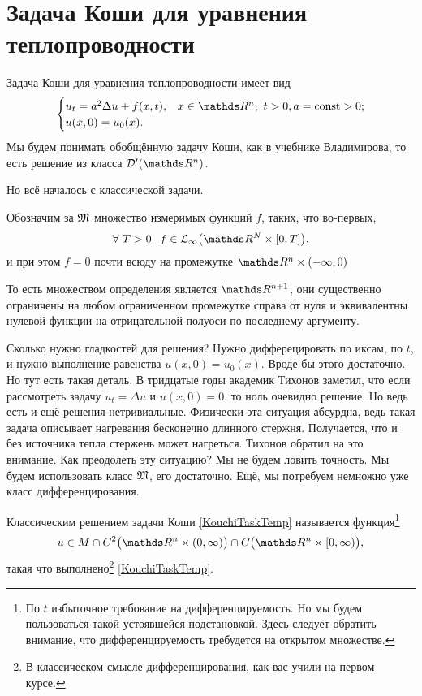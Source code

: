 \section{Задача Коши для уравнения теплопроводности}
Задача Коши для уравнения теплопроводности имеет вид
\begin{equation}\label{KouchiTaskTemp}
  \begin{cases}
     u_t = a^2\Delta u + f(x,t),& x\in\R^n,\ t>0,a=\const>0;\\
     u(x,0) = u_0(x).
  \end{cases}
\end{equation}
Мы будем понимать обобщённую задачу Коши, как в учебнике Владимирова, то есть решение из класса $\D'(\R^n)$.

Но всё началось с классической задачи.
\begin{Def}
  Обозначим за $\mathfrak M$ множество измеримых функций $f$, таких, что во-первых, 
\[\forall\ T>0\pau f\in \L_{\infty}\big(\R^N\times[0,T]\big),\]
и при этом $f=0$ почти всюду на промежутке $\R^n\times(-\infty,0)$
\end{Def}
То есть множеством определения является $\R^{n+1}$, они существенно ограничены на любом ограниченном промежутке справа от нуля и эквивалентны нулевой функции на отрицательной полуоси по последнему аргументу.

Сколько нужно гладкостей для решения? Нужно дифферецировать по иксам, по $t$, и нужно выполнение равенства $u(x,0)=u_0(x)$. Вроде бы этого достаточно. Но тут есть такая деталь. В тридцатые годы академик Тихонов заметил, что если рассмотреть задачу $u_t = \Delta u$ и $u(x,0)=0$, то ноль очевидно решение. Но ведь есть и ещё решения нетривиальные. Физически эта ситуация абсурдна, ведь такая задача описывает нагревания бесконечно длинного стержня. Получается, что и без источника тепла стержень может нагреться. Тихонов обратил на это внимание. Как преодолеть эту ситуацию? Мы не будем ловить точность. Мы будем использовать класс $\mathfrak M$, его достаточно. Ещё, мы потребуем немножно уже класс дифференцирования.
\begin{Def}
  Классическим решением задачи Коши \ref{KouchiTaskTemp} называется функция\footnote{По $t$ избыточное требование на дифференцируемость. Но мы будем пользоваться такой устоявшейся подстановкой. Здесь следует обратить внимание, что дифференцируемость требудется на открытом множестве.}
\[
  u\in M\cap C^2\big(\R^n\times(0,\infty)\big)\cap C\big(\R^n\times[0,\infty)\big),
\]
такая что выполнено\footnote{В классическом смысле дифференцирования, как вас учили на первом курсе.} \eqref{KouchiTaskTemp}.
\end{Def}

